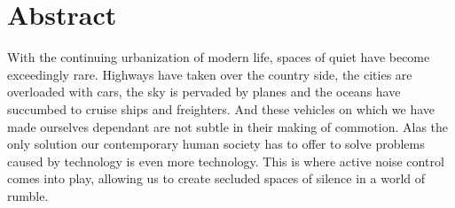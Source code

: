 \chapter{\centering Abstract}

With the continuing urbanization of modern life, spaces of quiet have become exceedingly rare. Highways have taken over the country side, the cities are overloaded with cars, the sky is pervaded by planes and the oceans have succumbed to cruise ships and freighters. And these vehicles on which we have made ourselves dependant are not subtle in their making of commotion.
Alas the only solution our contemporary human society has to offer to solve problems caused by technology is even more technology. This is where active noise control comes into play, allowing us to create secluded spaces of silence in a world of rumble.